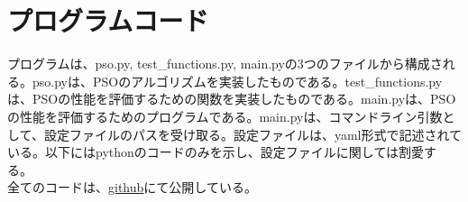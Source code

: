 \documentclass{jsarticle}
\begin{document}
\section{プログラムコード}
プログラムは、pso.py, test\_functions.py, main.pyの3つのファイルから構成される。pso.pyは、PSOのアルゴリズムを実装したものである。test\_functions.pyは、PSOの性能を評価するための関数を実装したものである。main.pyは、PSOの性能を評価するためのプログラムである。main.pyは、コマンドライン引数として、設定ファイルのパスを受け取る。設定ファイルは、yaml形式で記述されている。以下にはpythonのコードのみを示し、設定ファイルに関しては割愛する。\\
全てのコードは、\href{https://github.com/takeshiho0531/UTokyo-assignment/tree/8b08d135063f56aa030c3f327e3456ebad6ebe4a/3A/multi-agent_system/report1}{github}にて公開している。\\
\end{document}
